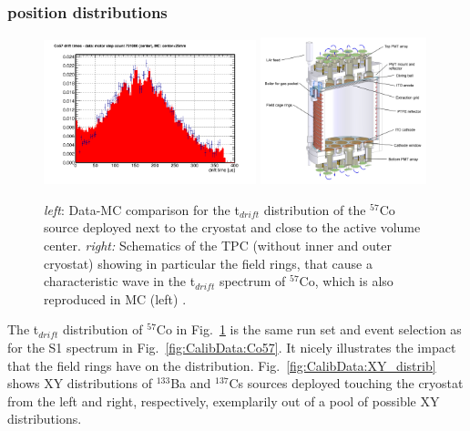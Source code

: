 \subsubsection{position distributions}
\begin{figure}[htbp]
\centering
\includegraphics[width=0.55\textwidth]{./Figures/Co57_tdrift_data_731000-center+25mm.png}
\includegraphics[width=0.43\textwidth]{./Figures/50kg_Assembly_4-1-13_section_annotated_2.JPG}
\caption{\textit{left}: Data-MC comparison for the t$_{drift}$ distribution of the $^{57}$Co source deployed next to the cryostat and close to the active volume center. 
\textit{right:} Schematics of the TPC (without inner and outer cryostat) showing in particular the field rings, that cause a characteristic wave in the t$_{drift}$ spectrum of $^{57}$Co, which is also reproduced in MC (left) \cite{DS50:first_paper}.
\label{fig:CalibData:Co57:t_drift}}
\end{figure}

The t$_{drift}$ distribution of $^{57}$Co in Fig.~\ref{fig:CalibData:Co57:t_drift} is the same run set and event selection as for the S1 spectrum in Fig.~\ref{fig:CalibData:Co57}. It nicely illustrates the impact that the field rings have on the distribution. Fig.~\ref{fig:CalibData:XY_distrib} shows XY distributions of $^{133}$Ba and $^{137}$Cs sources deployed touching the cryostat from the left and right, respectively, exemplarily out of a pool of possible XY distributions.

